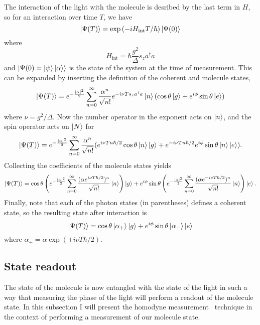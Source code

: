 The interaction of the light with the molecule is desribed by the last term in
$H$, so for an interaction over time $T$, we have
%
\begin{equation}
  \ket{\Psi(T)} = \exp\left(-iH_\text{int}T/\hbar\right)\ket{\Psi(0)}
\end{equation}
%
where
%
\begin{equation}
  H_\text{int} = \hbar \frac{g^2}{\Delta} s_z a^\dagger a
\end{equation}
%
and $\ket{\Psi(0) = \ket{\psi}\ket{\alpha}}$ is the state of the system at the
time of measurement. This can be expanded by inserting the definition of the
coherent and molecule states,
%
\begin{equation}
  \ket{\Psi(T)} = e^{-\frac{|\alpha|^2}{2}}\sum_{n=0}^\infty
   \frac{\alpha^n}{\sqrt{n!}} e^{-i\nu T s_z a^\dagger a} \ket{n} (\cos\theta
   \ket{g} + e^{i\phi}\sin\theta\ket{e})
\end{equation}
%
where $\nu = g^2/\Delta$.
Now the number operator in the exponent acts on $\ket{n}$, and the spin
operator acts on $\ket{N}$ for
%
\begin{equation}
   \ket{\Psi(T)} = e^{-\frac{|\alpha|^2}{2}}\sum_{n=0}^\infty
   \frac{\alpha^n}{\sqrt{n!}} (e^{i\nu T n \hbar/2}\cos\theta\ket{n}\ket{g} +
   e^{-i\nu T n \hbar/2}e^{i\phi}\sin\theta\ket{n}\ket{e}).
\end{equation}
%
Collecting the coefficients of the molecule states yields
%
\begin{equation}
  \ket{\Psi(T)} = \cos\theta\left(e^{-\frac{|\alpha|^2}{2}}\sum_{n=0}^\infty
   \frac{(\alpha e^{i\nu T \hbar/2})^n}{\sqrt{n!}}\ket{n}\right)\ket{g} +  
    e^{i\phi}\sin\theta\left(e^{-\frac{|\alpha|^2}{2}}\sum_{n=0}^\infty
   \frac{(\alpha e^{-i\nu T \hbar/2})^n}{\sqrt{n!}}\ket{n}\right)\ket{e}.
\end{equation}
%
Finally, note that each of the photon states (in parentheses) defines a
coherent state, so the resulting state after interaction is
%
\begin{equation}
  \ket{\Psi(T)} = \cos\theta\ket{\alpha_+}\ket{g} +
  e^{i\phi}\sin\theta\ket{\alpha_-}\ket{e}
  \label{mws:eqn:entangled}
\end{equation}
%
where $\alpha_\pm = \alpha \exp(\pm i \nu T \hbar/2)$.

\subsection{State readout}

The state of the molecule is now entangled with the state of the light in such
a way that measuring the phase of the light will perform a readout of the
molecule state. In this subsection I will present the homodyne
measurement~\cite{agarwal2012} technique in the context of performing a
measurement of our molecule state.

